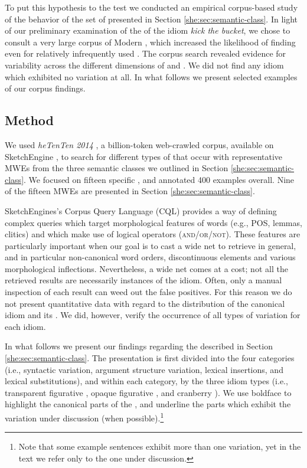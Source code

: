 \documentclass[output=paper]{langsci/langscibook}
\begin{document}
To put this hypothesis to the test we conducted an empirical corpus-based study of the behavior of the set of  presented in Section \ref{she:sec:semantic-class}. In light of our preliminary examination of the  of the idiom \textit{kick the bucket}, we chose to consult a very large corpus of Modern , which increased the likelihood of finding  even for relatively infrequently used . The corpus search revealed evidence for variability across the different dimensions of  and . We did not find any idiom which exhibited no variation at all. In what follows we present selected examples of our corpus findings.

\label{she:sec:findings}
\subsection{Method}\largerpage
\label{she:sec:method}
We used \emph{heTenTen 2014} \citep{baroni-bernardini-ferraresi-zanchetta-2009}, a billion-token web-crawled  corpus, available on SketchEngine \citep{sketchengine}, to search for different types of  that occur with representative MWEs from the three semantic classes we outlined in Section \ref{she:sec:semantic-class}. We focused on fifteen specific , and annotated 400 examples overall. Nine of the fifteen MWEs are presented in Section \ref{she:sec:semantic-class}.

SketchEngines's Corpus Query Language (CQL) provides a way of defining complex queries which target morphological features of words (e.g., POS, lemmas, clitics) and which make
use of logical operators (\textsc{and\slash or\slash not}). These features are particularly important when our goal is to cast a wide net to retrieve  in general, and in particular non-canonical word orders, discontinuous elements and various morphological inflections. Nevertheless, a wide net comes at a cost; not all the retrieved results are necessarily instances of the idiom. Often, only a manual inspection of each result can weed out the false positives. For this reason we do not present quantitative data with regard to the distribution of the canonical idiom and its . We did, however, verify the occurrence of all types of variation for each idiom.

In what follows we present our findings regarding the  described in Section \ref{she:sec:semantic-class}. The presentation is first divided into the four  categories (i.e., syntactic variation, argument structure variation, lexical insertions, and lexical substitutions), and within each category, by the three idiom types (i.e., transparent figurative , opaque figurative , and cranberry ). We use boldface to highlight the canonical parts of the , and underline the parts which exhibit the variation under discussion (when possible).\footnote{Note that some example sentences exhibit more than one variation, yet in the text we refer only to the one under discussion.}
\end{document}
